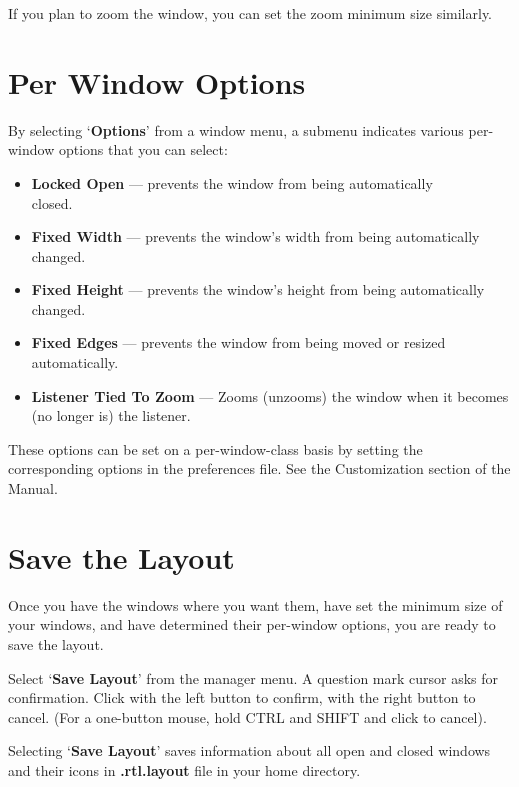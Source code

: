 If you plan to zoom the window, you can set the zoom minimum size
similarly.

\section{Per Window Options}

By selecting `{\bf Options}' from a window menu, a submenu
indicates various per-window options that you can select:

\begin{itemize}
\item {\bf Locked Open} --- prevents the window from being
automatical\-ly \\ closed.

\item {\bf Fixed Width} --- prevents the window's width from being automatically
changed.

\item {\bf Fixed Height} --- prevents the window's height from being
automatically changed.

\item {\bf Fixed Edges} --- prevents the window from being moved or resized
automatically.

\item {\bf Listener Tied To Zoom} --- Zooms (unzooms) the window when it becomes
(no longer is) the listener.

\end{itemize}

These options can be set on a per-window-class basis by setting the
corresponding options in the preferences file.
See the Customization section of the Manual.

\section{Save the Layout}

Once you have the windows where you want them, have
set the minimum size of your windows, and have determined their
per-window options, you are ready to save the layout.

Select `{\bf Save Layout}' from the manager menu.  A question mark
cursor asks for confirmation.  Click with the left button to confirm,
with the right button to cancel.
(For a one-button mouse, hold CTRL and SHIFT and click to cancel).

Selecting `{\bf Save Layout}' saves information about all open and closed
windows and their icons in {\bf .rtl.layout} file in your home directory.

